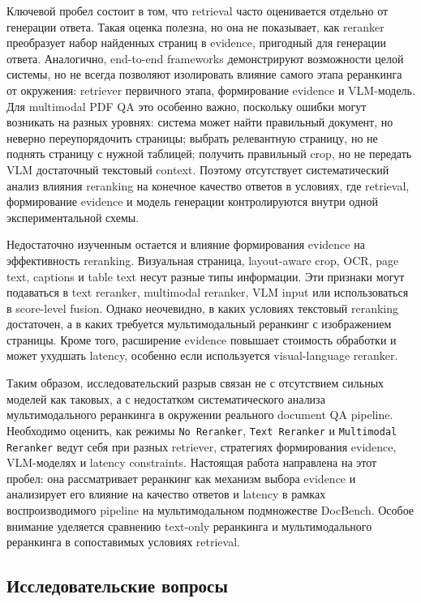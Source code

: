 \documentclass[conference]{IEEEtran}
\begin{document}
Ключевой пробел состоит в том, что retrieval часто оценивается отдельно от генерации ответа. Такая оценка полезна, но она не показывает, как reranker преобразует набор найденных страниц в evidence, пригодный для генерации ответа. Аналогично, end-to-end frameworks демонстрируют возможности целой системы, но не всегда позволяют изолировать влияние самого этапа реранкинга от окружения: retriever первичного этапа, формирование evidence и VLM-модель. Для multimodal PDF QA это особенно важно, поскольку ошибки могут возникать на разных уровнях: система может найти правильный документ, но неверно переупорядочить страницы; выбрать релевантную страницу, но не поднять страницу с нужной таблицей; получить правильный crop, но не передать VLM достаточный текстовый context. Поэтому отсутствует систематический анализ влияния reranking на конечное качество ответов в условиях, где retrieval, формирование evidence и модель генерации контролируются внутри одной экспериментальной схемы.

Недостаточно изученным остается и влияние формирования evidence на эффективность reranking. Визуальная страница, layout-aware crop, OCR, page text, captions и table text несут разные типы информации. Эти признаки могут подаваться в text reranker, multimodal reranker, VLM input или использоваться в score-level fusion. Однако неочевидно, в каких условиях текстовый reranking достаточен, а в каких требуется мультимодальный реранкинг с изображением страницы. Кроме того, расширение evidence повышает стоимость обработки и может ухудшать latency, особенно если используется visual-language reranker.

Таким образом, исследовательский разрыв связан не с отсутствием сильных моделей как таковых, а с недостатком систематического анализа мультимодального реранкинга в окружении реального document QA pipeline. Необходимо оценить, как режимы \texttt{No Reranker}, \texttt{Text Reranker} и \texttt{Multimodal Reranker} ведут себя при разных retriever, стратегиях формирования evidence, VLM-моделях и latency constraints. Настоящая работа направлена на этот пробел: она рассматривает реранкинг как механизм выбора evidence и анализирует его влияние на качество ответов и latency в рамках воспроизводимого pipeline на мультимодальном подмножестве DocBench. Особое внимание уделяется сравнению text-only реранкинга и мультимодального реранкинга в сопоставимых условиях retrieval.

\subsection{Исследовательские вопросы}
\end{document}

